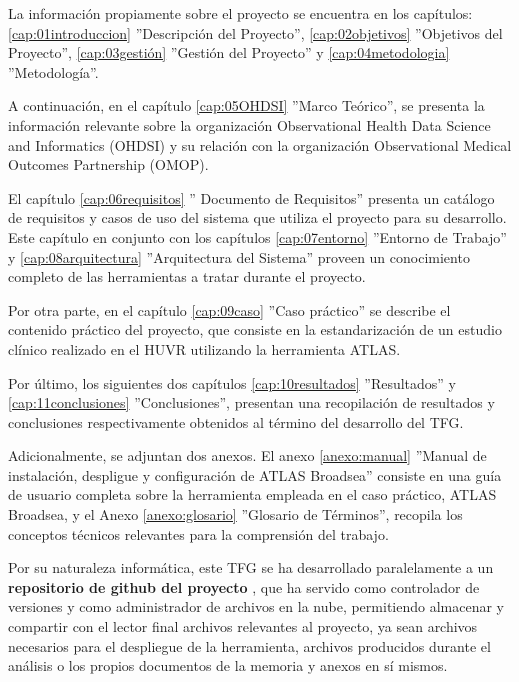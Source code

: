 La información propiamente sobre el proyecto se encuentra en los capítulos: \ref{cap:01introduccion} ''Descripción del Proyecto'',  \ref{cap:02objetivos} ''Objetivos del Proyecto'', \ref{cap:03gestión} ''Gestión del Proyecto'' y \ref{cap:04metodologia} ''Metodología''.

A continuación, en el capítulo \ref{cap:05OHDSI} ''Marco Teórico'', se presenta la información relevante sobre la organización Observational Health Data Science and Informatics (OHDSI) y su relación con la organización Observational Medical Outcomes Partnership (OMOP).

El capítulo \ref{cap:06requisitos} '' Documento de Requisitos'' presenta un catálogo de requisitos y casos de uso del sistema que utiliza el proyecto para su desarrollo. Este capítulo en conjunto con los capítulos \ref{cap:07entorno} ''Entorno de Trabajo'' y \ref{cap:08arquitectura} ''Arquitectura del Sistema'' proveen un conocimiento completo de las herramientas a tratar durante el proyecto. 

Por otra parte, en el capítulo \ref{cap:09caso} ''Caso práctico'' se describe el contenido práctico del proyecto, que consiste en la estandarización de un estudio clínico realizado en el HUVR utilizando la herramienta ATLAS. 

Por último, los siguientes dos capítulos \ref{cap:10resultados} ''Resultados'' y \ref{cap:11conclusiones} ''Conclusiones'', presentan una recopilación de resultados y conclusiones respectivamente obtenidos al término del desarrollo del TFG. 

Adicionalmente, se adjuntan dos anexos. El anexo \ref{anexo:manual} ''Manual de instalación, despligue y configuración de ATLAS Broadsea'' consiste en una guía de usuario completa sobre la herramienta empleada en el caso práctico, ATLAS Broadsea, y el Anexo \ref{anexo:glosario} ''Glosario de Términos'', recopila los conceptos técnicos relevantes para la comprensión del trabajo. 

Por su naturaleza informática, este TFG se ha desarrollado paralelamente a un \textbf{repositorio de github del proyecto} \cite{vallealonsodc}, que ha servido como controlador de versiones y como administrador de archivos en la nube, permitiendo almacenar y compartir con el lector final archivos relevantes al proyecto, ya sean archivos necesarios para el despliegue de la herramienta, archivos producidos durante el análisis o los propios documentos de la memoria y anexos en sí mismos.
